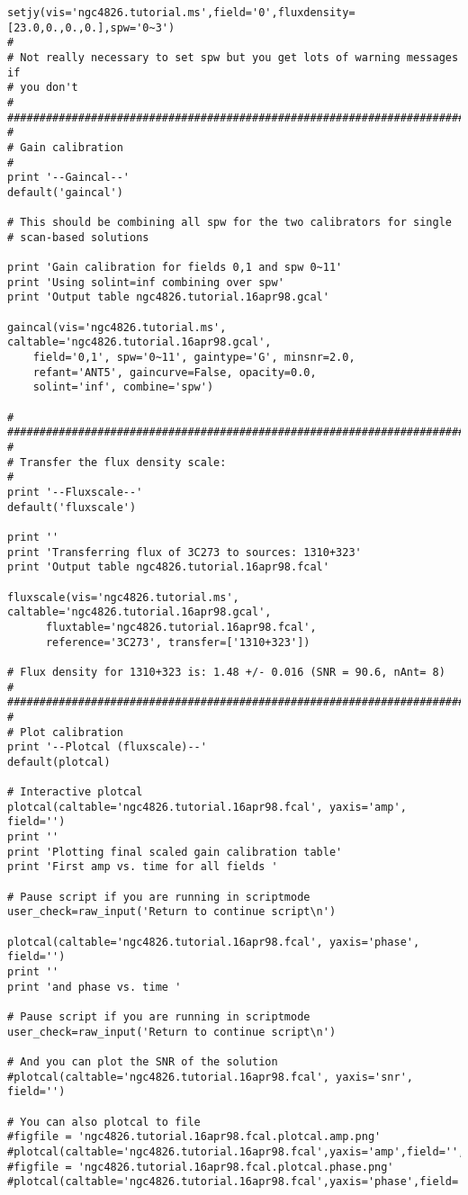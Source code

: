 \begin{verbatim}
setjy(vis='ngc4826.tutorial.ms',field='0',fluxdensity=[23.0,0.,0.,0.],spw='0~3')
#
# Not really necessary to set spw but you get lots of warning messages if
# you don't
#
##########################################################################
#
# Gain calibration
#
print '--Gaincal--'
default('gaincal')

# This should be combining all spw for the two calibrators for single
# scan-based solutions

print 'Gain calibration for fields 0,1 and spw 0~11'
print 'Using solint=inf combining over spw'
print 'Output table ngc4826.tutorial.16apr98.gcal'

gaincal(vis='ngc4826.tutorial.ms', caltable='ngc4826.tutorial.16apr98.gcal',
	field='0,1', spw='0~11', gaintype='G', minsnr=2.0,
	refant='ANT5', gaincurve=False, opacity=0.0,
	solint='inf', combine='spw')

#
##########################################################################
#
# Transfer the flux density scale:
#
print '--Fluxscale--'
default('fluxscale')

print ''
print 'Transferring flux of 3C273 to sources: 1310+323'
print 'Output table ngc4826.tutorial.16apr98.fcal'

fluxscale(vis='ngc4826.tutorial.ms', caltable='ngc4826.tutorial.16apr98.gcal',
	  fluxtable='ngc4826.tutorial.16apr98.fcal',
	  reference='3C273', transfer=['1310+323'])

# Flux density for 1310+323 is: 1.48 +/- 0.016 (SNR = 90.6, nAnt= 8)
#
##########################################################################
#
# Plot calibration
print '--Plotcal (fluxscale)--'
default(plotcal)

# Interactive plotcal
plotcal(caltable='ngc4826.tutorial.16apr98.fcal', yaxis='amp', field='')
print ''
print 'Plotting final scaled gain calibration table'
print 'First amp vs. time for all fields '
	
# Pause script if you are running in scriptmode
user_check=raw_input('Return to continue script\n')

plotcal(caltable='ngc4826.tutorial.16apr98.fcal', yaxis='phase', field='')
print ''
print 'and phase vs. time '

# Pause script if you are running in scriptmode
user_check=raw_input('Return to continue script\n')

# And you can plot the SNR of the solution
#plotcal(caltable='ngc4826.tutorial.16apr98.fcal', yaxis='snr', field='')

# You can also plotcal to file
#figfile = 'ngc4826.tutorial.16apr98.fcal.plotcal.amp.png'
#plotcal(caltable='ngc4826.tutorial.16apr98.fcal',yaxis='amp',field='',showgui=False,figfile=figfile)
#figfile = 'ngc4826.tutorial.16apr98.fcal.plotcal.phase.png'
#plotcal(caltable='ngc4826.tutorial.16apr98.fcal',yaxis='phase',field='',showgui=False,figfile=figfile)


\end{verbatim}
